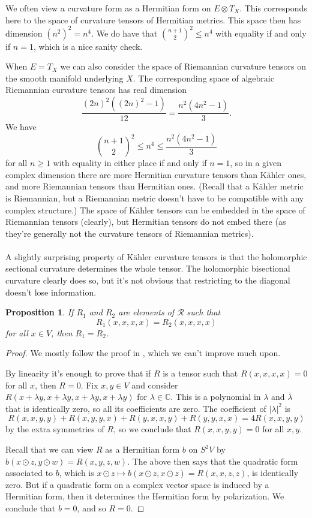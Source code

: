 \documentclass[11pt]{article}
\newtheorem{prop}[theo]{Proposition}
\theoremstyle{definition}
\newcommand{\kk}[1]{\mathbb{#1}}
\newcommand{\cc}[1]{\mathcal{#1}}
\begin{document}
We often view a curvature form as a Hermitian form on $E \otimes T_X$. This corresponds here to the space of curvature tensors of Hermitian metrics. This space then has dimension $(n^2)^2 = n^4$. We do have that $\binom{n+1}{2}^2 \leq n^4$ with equality if and only if $n = 1$, which is a nice sanity check.

When $E = T_X$ we can also consider the space of Riemannian curvature tensors on the smooth manifold underlying $X$. The corresponding space of algebraic Riemannian curvature tensors has real dimension
$$
\frac{(2n)^2((2n)^2 - 1)}{12}
= \frac{n^2(4n^2 - 1)}{3}.
$$
We have
$$
\binom{n+1}{2}^2 \leq n^4 \leq \frac{n^2(4n^2 - 1)}{3}
$$
for all $n \geq 1$ with equality in either place if and only if $n = 1$, so in a given complex dimension there are more Hermitian curvature tensors than K\"ahler ones, and more Riemannian tensors than Hermitian ones. (Recall that a K\"ahler metric is Riemannian, but a Riemannian metric doesn't have to be compatible with any complex structure.) The space of K\"ahler tensors can be embedded in the space of Riemannian tensors (clearly), but Hermitian tensors do not embed there (as they're generally not the curvature tensors of Riemannian metrics).


\paragraph{}

A slightly surprising property of K\"ahler curvature tensors is that the holomorphic sectional curvature determines the whole tensor. The holomorphic bisectional curvature clearly does so, but it's not obvious that restricting to the diagonal doesn't lose information.

\begin{prop}
If $R_1$ and $R_2$ are elements of $\cc R$ such that
$$
R_1(x,x,x,x) = R_2(x,x,x,x)
$$
for all $x \in V$, then $R_1 = R_2$.
\end{prop}

\begin{proof}
We mostly follow the proof in \cite[Lemma~7.19]{zheng2000complex}, which we can't improve much upon.

By linearity it's enough to prove that if $R$ is a tensor such that $R(x,x,x,x) = 0$ for all $x$, then $R = 0$. Fix $x, y \in V$ and consider $R(x+\lambda y,x+\lambda y,x+\lambda y,x+\lambda y)$ for $\lambda \in \kk C$. This is a polynomial in $\lambda$ and $\bar\lambda$ that is identically zero, so all its coefficients are zero. The coefficient of $|\lambda|^2$ is
$$
R(x,x,y,y) + R(x,y,y,x) + R(y,x,x,y) + R(y,y,x,x)
= 4 R(x,x,y,y)
$$
by the extra symmetries of $R$, so we conclude that $R(x,x,y,y) = 0$ for all $x, y$.

Recall that we can view $R$ as a Hermitian form $b$ on $S^2V$ by $b(x \odot z, y \odot w) = R(x,y,z,w)$. The above then says that the quadratic form associated to $b$, which is $x \odot z \mapsto b(x \odot z, x \odot z) = R(x,x,z,z)$, is identically zero. But if a quadratic form on a complex vector space is induced by a Hermitian form, then it determines the Hermitian form by polarization. We conclude that $b = 0$, and so $R = 0$.
\end{proof}
\end{document}
